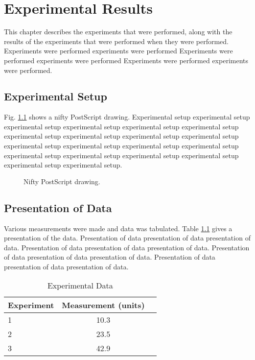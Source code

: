\chapter{Experimental Results}
\label{ch-results}

This chapter describes the experiments that were performed, along with the
results of the experiments that were performed when they were performed.
Experiments were performed experiments were performed
Experiments were performed experiments were performed
Experiments were performed experiments were performed.

\section{Experimental Setup}

Fig. \ref{fig-nifty} shows a nifty PostScript drawing.
Experimental setup experimental setup experimental setup experimental setup
experimental setup experimental setup experimental setup experimental setup
experimental setup experimental setup experimental setup experimental setup
experimental setup experimental setup experimental setup experimental setup
experimental setup experimental setup experimental setup experimental setup.
\begin{figure}
\smallskip
\centerline{}
\smallskip
\caption{Nifty PostScript drawing.}
\label{fig-nifty}
\smallskip
\end{figure}

\section{Presentation of Data}

Various measurements were made and data was tabulated.
Table \ref{table-data} gives a presentation of the data.
Presentation of data presentation of data presentation of data.
Presentation of data presentation of data presentation of data.
Presentation of data presentation of data presentation of data.
Presentation of data presentation of data presentation of data.
\begin{table}
\smallskip
\begin{center}
\begin{tabular}{|l|c|c|}
\hline
Experiment & Measurement (units) \\
\hline
1	&	10.3 \\
\hline
2	&	23.5 \\
\hline
3	&	42.9 \\
\hline
\end{tabular}
\end{center}
\smallskip
\caption{Experimental Data}
\label{table-data}
\smallskip
\end{table}


